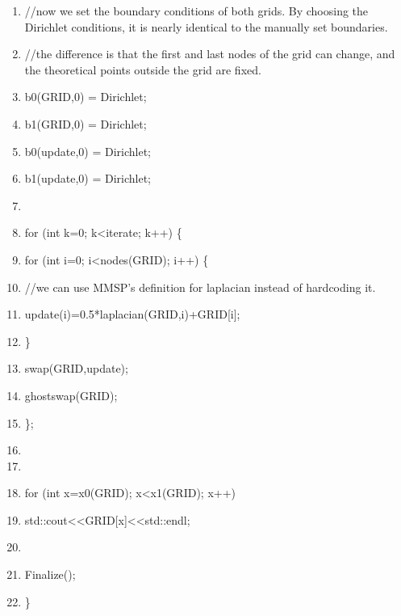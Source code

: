\documentclass[10pt]{article}
\begin{document}
\begin{shadebox}
\begin{enumerate} \itemsep1pt \parskip0pt 
\setcounter{enumi}{30}
\item //now we set the boundary conditions of both grids.  By choosing the Dirichlet conditions, it is nearly identical to the manually set boundaries.  
\item //the difference is that the first and last nodes of the grid can change, and the theoretical points outside the grid are fixed.
\item b0(GRID,0) = Dirichlet;
\item b1(GRID,0) = Dirichlet;
\item b0(update,0) = Dirichlet;
\item b1(update,0) = Dirichlet;
\item 

\item for (int k=0; k\textless iterate; k++) \{
\item \hspace{10pt}         for (int i=0; i\textless nodes(GRID); i++) \{
\item //we can use MMSP's definition for laplacian instead of hardcoding it.
\item \hspace{10pt} \hspace{10pt}              update(i)=0.5*laplacian(GRID,i)+GRID[i];
\item \hspace{10pt}         \}
\item \hspace{10pt}         swap(GRID,update);
\item \hspace{10pt}         ghostswap(GRID);
\item \};
\item 
\item 
\item for (int x=x0(GRID); x\textless x1(GRID); x++)
\item \hspace{10pt}         std::cout\textless \textless GRID[x]\textless \textless std::endl;
\item 
\item Finalize();
\item \}
\end{enumerate}
\end{shadebox}
\end{document}
